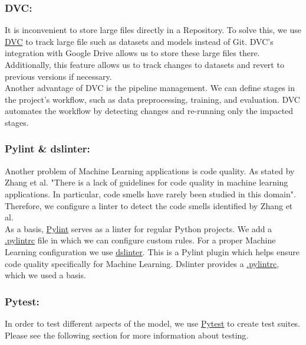 \subsubsection{DVC:} \label{sec:ml-pipeline:dvc}
It is inconvenient to store large files directly in a Repository. To solve this, we use {\color{blue} \href{https://dvc.org/}{DVC}} to track large file such as datasets and models instead of Git. DVC's integration with Google Drive allows us to store these large files there. Additionally, this feature allows us to track changes to datasets and revert to previous versions if necessary. \\
Another advantage of DVC is the pipeline management. We can define stages in the project's workflow, such as data preprocessing, training, and evaluation. DVC automates the workflow by detecting changes and re-running only the impacted stages.

\subsubsection{Pylint \& dslinter:} \label{sec:ml-pipeline:lint}
Another problem of Machine Learning applications is code quality. As stated by Zhang et al. \cite{zhang2022code} "There is a lack of guidelines for code quality in machine learning applications. In particular, code smells have rarely been studied in this domain".
Therefore, we configure a linter to detect the code smells identified by Zhang et al. \\
As a basis, {\color{blue} \href{https://pylint.pycqa.org/en/latest/index.html}{Pylint}} serves as a linter for regular Python projects. We add a {\color{blue} \href{https://github.com/remla24-team12/model-training/blob/main/.pylintrc}{.pylintrc}} file in which we can configure custom rules. For a proper Machine Learning configuration we use {\color{blue} \href{https://github.com/SERG-Delft/dslinter}{dslinter}}. This is a Pylint plugin which helps ensure code quality specifically for Machine Learning. Dslinter provides a {\color{blue} \href{https://github.com/SERG-Delft/dslinter/blob/main/docs/pylint-configuration-examples/pylintrc-for-ml-projects/.pylintrc}{.pylintrc}}, which we used a basis. \\


\subsubsection{Pytest:}
In order to test different aspects of the model, we use {\color{blue} \href{https://pytest.org}{Pytest}} to create test suites. Please see the following section for more information about testing.

